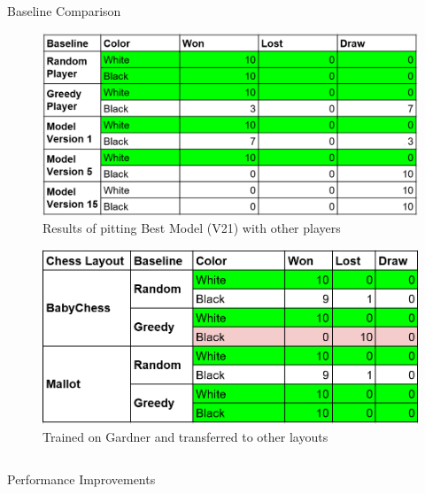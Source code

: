 \documentclass[final]{beamer}
\newlength{\onecolwid}
\newlength{\twocolwid}
\begin{document}
\begin{frame}[t]
\begin{columns}[t]
\begin{column}{\twocolwid}
\begin{columns}[t,totalwidth=\twocolwid]
\begin{column}{\onecolwid}
\begin{column}{\onecolwid}
\begin{block}{Baseline Comparison}


\begin{figure}
\includegraphics[width=0.8\linewidth]{baseline.png}
\caption{Results of pitting Best Model (V21) with other players}
\end{figure}

\begin{figure}
\includegraphics[width=0.7\linewidth]{diff_layouts.png}
\caption{Trained on Gardner and transferred to other layouts}
\end{figure}

\end{block}


\end{column} %

\begin{block}{Performance Improvements}


\end{block}
\end{column}
\end{columns}
\end{column}
\end{columns}
\end{frame}
\end{document}
